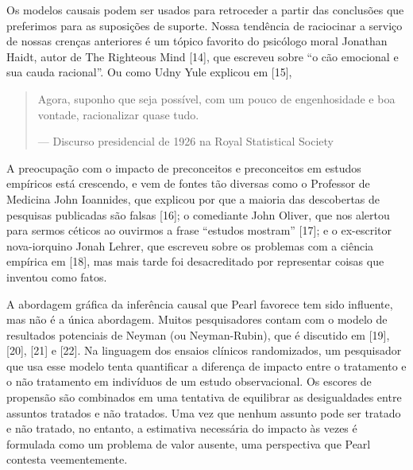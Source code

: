     Os modelos causais podem ser usados para retroceder a partir das conclusões que preferimos para as suposições de suporte. Nossa tendência de raciocinar a serviço de nossas crenças anteriores é um tópico favorito do psicólogo moral Jonathan Haidt, autor de The Righteous Mind [14], que escreveu sobre ``o cão emocional e sua cauda racional''. Ou como Udny Yule explicou em [15],

\begin{quotation}
        Agora, suponho que seja possível, com um pouco de engenhosidade e boa vontade, racionalizar quase tudo.
        
        — Discurso presidencial de 1926 na Royal Statistical Society
\end{quotation}

    A preocupação com o impacto de preconceitos e preconceitos em estudos empíricos está crescendo, e vem de fontes tão diversas como o Professor de Medicina John Ioannides, que explicou por que a maioria das descobertas de pesquisas publicadas são falsas [16]; o comediante John Oliver, que nos alertou para sermos céticos ao ouvirmos a frase ``estudos mostram'' [17]; e o ex-escritor nova-iorquino Jonah Lehrer, que escreveu sobre os problemas com a ciência empírica em [18], mas mais tarde foi desacreditado por representar coisas que inventou como fatos.

    A abordagem gráfica da inferência causal que Pearl favorece tem sido influente, mas não é a única abordagem. Muitos pesquisadores contam com o modelo de resultados potenciais de Neyman (ou Neyman-Rubin), que é discutido em [19], [20], [21] e [22]. Na linguagem dos ensaios clínicos randomizados, um pesquisador que usa esse modelo tenta quantificar a diferença de impacto entre o tratamento e o não tratamento em indivíduos de um estudo observacional. Os escores de propensão são combinados em uma tentativa de equilibrar as desigualdades entre assuntos tratados e não tratados. Uma vez que nenhum assunto pode ser tratado e não tratado, no entanto, a estimativa necessária do impacto às vezes é formulada como um problema de valor ausente, uma perspectiva que Pearl contesta veementemente.

